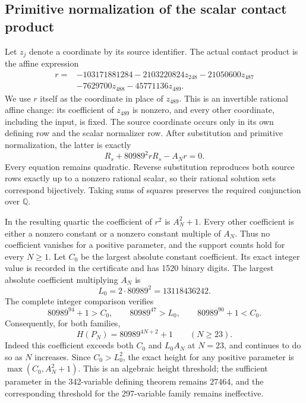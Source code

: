 \documentclass[11pt,a4paper]{article}
\theoremstyle{remark}\newtheorem{remark}[theorem]{Remark}
\newcommand{\Q}{\mathbb Q}\newcommand{\Z}{\mathbb Z}\newcommand{\HH}{\mathcal H}
\begin{document}
\subsection{Primitive normalization of the scalar contact product}
Let $z_j$ denote a coordinate by its source identifier. The actual
contact product is the affine expression
\[
 \begin{aligned}
 r={}&-103171881284-2103220824z_{248}-21050600z_{487}\\
     &-7629700z_{488}-45771136z_{489}.
 \end{aligned}
\]
We use $r$ itself as the coordinate in place of $z_{489}$. This is an
invertible rational affine change: its coefficient of $z_{489}$ is
nonzero, and every other coordinate, including the input, is fixed.
The source coordinate occurs only in its own defining row and the
scalar normalizer row. After substitution and primitive normalization,
the latter is exactly
\[
                  R_s+80989^2rR_s-A_Nr=0.
\]
Every equation remains quadratic. Reverse substitution reproduces both
source rows exactly up to a nonzero rational scalar, so their rational
solution sets correspond bijectively. Taking sums of squares preserves
the required conjunction over $\Q$.

In the resulting quartic the coefficient of $r^2$ is $A_N^2+1$.
Every other coefficient is either a nonzero constant or a nonzero constant
multiple of $A_N$. Thus no coefficient vanishes for a positive parameter,
and the support counts hold for every $N\ge1$.
Let $C_0$ be the largest absolute constant coefficient. Its exact integer
value is recorded in the certificate and has 1520 binary digits. The
largest absolute coefficient multiplying $A_N$ is
\[
                       L_0=2\cdot80989^2=13118436242.
\]
The complete integer comparison verifies
\[
 80989^{94}+1>C_0,\qquad80989^{47}>L_0,
 \qquad80989^{90}+1<C_0.
\]
Consequently, for both families,
\[
                        H(P_N)=80989^{4N+2}+1
                        \qquad(N\ge23).
\]
Indeed this coefficient exceeds both $C_0$ and $L_0A_N$ at $N=23$,
and continues to do so as $N$ increases. Since $C_0>L_0^2$, the exact
height for any positive parameter is $\max(C_0,A_N^2+1)$.
This is an algebraic height threshold; the sufficient parameter in the
342-variable defining theorem remains $27464$, and the corresponding
threshold for the 297-variable family remains ineffective.
\end{document}
